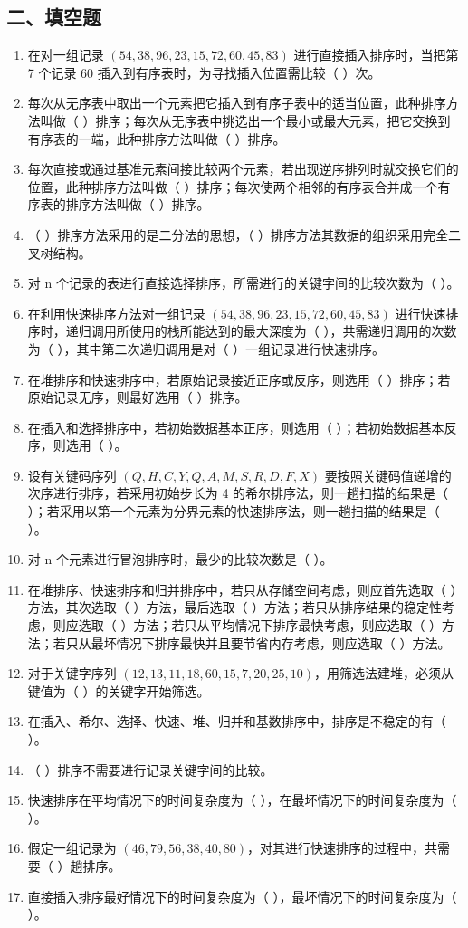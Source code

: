 \documentclass[12pt, a4paper]{article}
\begin{document}
\subsection*{二、填空题}
\begin{enumerate}
    \item 在对一组记录 $(54, 38, 96, 23, 15, 72, 60, 45, 83)$ 进行直接插入排序时，当把第 7 个记录 60 插入到有序表时，为寻找插入位置需比较（ ）次。
    \item 每次从无序表中取出一个元素把它插入到有序子表中的适当位置，此种排序方法叫做（ ）排序；每次从无序表中挑选出一个最小或最大元素，把它交换到有序表的一端，此种排序方法叫做（ ）排序。
    \item 每次直接或通过基准元素间接比较两个元素，若出现逆序排列时就交换它们的位置，此种排序方法叫做（ ）排序；每次使两个相邻的有序表合并成一个有序表的排序方法叫做（ ）排序。
    \item （ ）排序方法采用的是二分法的思想，（ ）排序方法其数据的组织采用完全二叉树结构。
    \item 对 n 个记录的表进行直接选择排序，所需进行的关键字间的比较次数为（ ）。
    \item 在利用快速排序方法对一组记录 $(54, 38, 96, 23, 15, 72, 60, 45, 83)$ 进行快速排序时，递归调用所使用的栈所能达到的最大深度为（ ），共需递归调用的次数为（ ），其中第二次递归调用是对（ ）一组记录进行快速排序。
    \item 在堆排序和快速排序中，若原始记录接近正序或反序，则选用（ ）排序；若原始记录无序，则最好选用（ ）排序。
    \item 在插入和选择排序中，若初始数据基本正序，则选用（ ）；若初始数据基本反序，则选用（ ）。
    \item 设有关键码序列 $(Q, H, C, Y, Q, A, M, S, R, D, F, X)$ 要按照关键码值递增的次序进行排序，若采用初始步长为 4 的希尔排序法，则一趟扫描的结果是（ ）；若采用以第一个元素为分界元素的快速排序法，则一趟扫描的结果是（ ）。
    \item 对 n 个元素进行冒泡排序时，最少的比较次数是（ ）。
    \item 在堆排序、快速排序和归并排序中，若只从存储空间考虑，则应首先选取（ ）方法，其次选取（ ）方法，最后选取（ ）方法；若只从排序结果的稳定性考虑，则应选取（ ）方法；若只从平均情况下排序最快考虑，则应选取（ ）方法；若只从最坏情况下排序最快并且要节省内存考虑，则应选取（ ）方法。
    \item 对于关键字序列 $(12, 13, 11, 18, 60, 15, 7, 20, 25, 10)$，用筛选法建堆，必须从键值为（ ）的关键字开始筛选。
    \item 在插入、希尔、选择、快速、堆、归并和基数排序中，排序是不稳定的有（ ）。
    \item （ ）排序不需要进行记录关键字间的比较。
    \item 快速排序在平均情况下的时间复杂度为（ ），在最坏情况下的时间复杂度为（ ）。
    \item 假定一组记录为 $(46, 79, 56, 38, 40, 80)$，对其进行快速排序的过程中，共需要（ ）趟排序。
    \item 直接插入排序最好情况下的时间复杂度为（ ），最坏情况下的时间复杂度为（ ）。
\end{enumerate}
\end{document}
